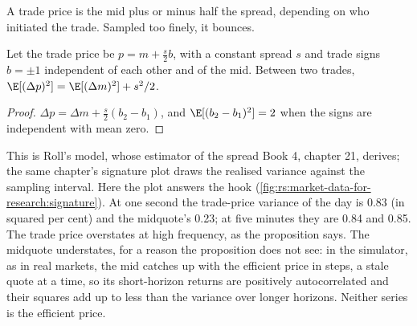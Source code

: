 A trade price is the mid plus or minus half the spread, depending on who initiated the trade. Sampled too finely, it bounces.

\begin{proposition}\label{prop:rs:market-data-for-research:bounce}
Let the trade price be $p = m + \tfrac s2 b$, with a constant spread $s$ and trade signs $b = \pm1$ independent of each other and
of the mid. Between two trades, $\E[(\Delta p)^2] = \E[(\Delta m)^2] + s^2/2$.
\end{proposition}

\begin{proof}
$\Delta p = \Delta m + \tfrac s2(b_2 - b_1)$, and $\E[(b_2 - b_1)^2] = 2$ when the signs are independent with mean zero.
\end{proof}

This is Roll's model, whose estimator of the spread Book 4, chapter 21, derives; the same chapter's signature plot draws the
realised variance against the sampling interval. Here the plot answers the hook
(\cref{fig:rs:market-data-for-research:signature}). At one second the trade-price variance of the day is 0.83 (in squared
per cent) and the midquote's 0.23; at five minutes they are 0.84 and 0.85. The trade price overstates at high frequency, as the
proposition says. The midquote understates, for a reason the proposition does not see: in the simulator, as in real markets,
the mid catches up with the efficient price in steps, a stale quote at a time, so its short-horizon returns are positively
autocorrelated and their squares add up to less than the variance over longer horizons. Neither series is the efficient price.

\begin{omfigure}

\label{fig:rs:market-data-for-research:signature}
\end{omfigure}

